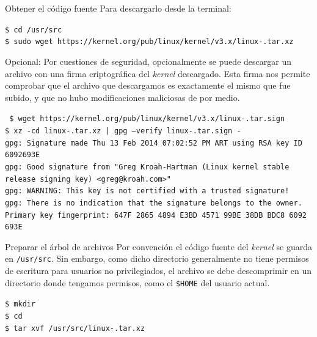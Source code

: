 \begin{frame}{Obtener el código fuente}
  Para descargarlo desde la terminal:
  \begin{block}{}
    \small {
    \texttt{\$ cd /usr/src}\\
    \texttt{\$ sudo wget
      https://kernel.org/pub/linux/kernel/v3.x/linux-\KERNELBASEVERSION.tar.xz} }
  \end{block}
  \vfill
  \alert{Opcional}: Por cuestiones de seguridad, opcionalmente se puede
  descargar un archivo con una firma criptográfica del \textit{kernel}
  descargado. Esta firma nos permite comprobar que el archivo que
  descargamos es exactamente el mismo que fue subido, y que no hubo
  modificaciones maliciosas de por medio.
  \begin{block}{}
    \tiny{\texttt{%
\$ wget https://kernel.org/pub/linux/kernel/v3.x/linux-\KERNELBASEVERSION.tar.sign \\
\$ xz -cd linux-\KERNELBASEVERSION.tar.xz | gpg --verify linux-\KERNELBASEVERSION.tar.sign -\\
gpg: Signature made Thu 13 Feb 2014 07:02:52 PM ART using RSA key ID 6092693E\\
gpg: Good signature from "Greg Kroah-Hartman (Linux kernel stable release signing key) <greg@kroah.com>"\\
gpg: WARNING: This key is not certified with a trusted signature!\\
gpg:          There is no indication that the signature belongs to the owner.\\
Primary key fingerprint: 647F 2865 4894 E3BD 4571  99BE 38DB BDC8 6092 693E}}
\end{block}
    
\end{frame}

\begin{frame}{Preparar el árbol de archivos}
  Por convención el código fuente del \textit{kernel} se guarda en
  \texttt{/usr/src}. Sin embargo, como dicho directorio generalmente no
  tiene permisos de escritura para usuarios no privilegiados, el archivo se
  debe descomprimir en un directorio donde tengamos permisos, como el
  \texttt{\$HOME} del usuario actual.
  
  { \small
  \begin{block}{}
    \texttt{\$ mkdir \KERNELSOURCEPATH}\\
    \texttt{\$ cd \KERNELSOURCEPATH}\\
    \texttt{\$ tar xvf /usr/src/linux-\KERNELBASEVERSION.tar.xz}
  \end{block}}
\end{frame}

